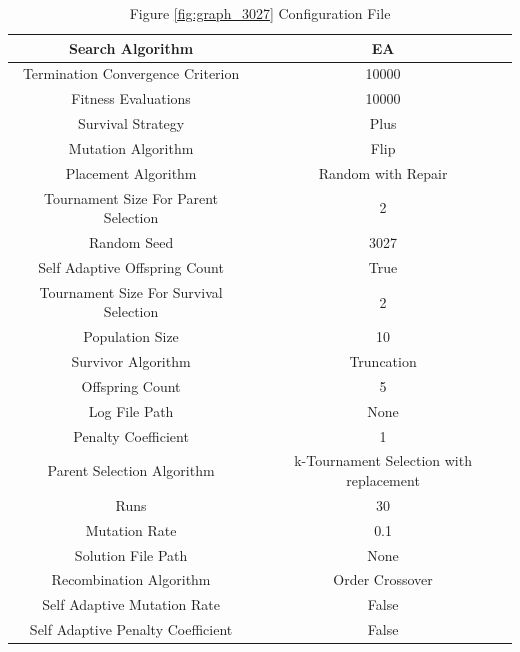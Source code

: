 \documentclass{standalone}
\begin{document}
\begin{table}[!htb]
	\centering
	\caption{Figure \ref{fig:graph_3027} Configuration File}
	\label{tab:graph_3027}
	\begin{tabular}{| c | c |}
		\hline
		Search Algorithm		& EA		 \\
		\hline
		Termination Convergence Criterion		& 10000		 \\
		\hline
		Fitness Evaluations		& 10000		 \\
		\hline
		Survival Strategy		& Plus		 \\
		\hline
		Mutation Algorithm		& Flip		 \\
		\hline
		Placement Algorithm		& Random with Repair		 \\
		\hline
		Tournament Size For Parent Selection		& 2		 \\
		\hline
		Random Seed		& 3027		 \\
		\hline
		Self Adaptive Offspring Count		& True		 \\
		\hline
		Tournament Size For Survival Selection		& 2		 \\
		\hline
		Population Size		& 10		 \\
		\hline
		Survivor Algorithm		& Truncation		 \\
		\hline
		Offspring Count		& 5		 \\
		\hline
		Log File Path		& None		 \\
		\hline
		Penalty Coefficient		& 1		 \\
		\hline
		Parent Selection Algorithm		& k-Tournament Selection with replacement		 \\
		\hline
		Runs		& 30		 \\
		\hline
		Mutation Rate		& 0.1		 \\
		\hline
		Solution File Path		& None		 \\
		\hline
		Recombination Algorithm		& Order Crossover		 \\
		\hline
		Self Adaptive Mutation Rate		& False		 \\
		\hline
		Self Adaptive Penalty Coefficient		& False		 \\
		\hline
	\end{tabular}
\end{table}
\end{document}
